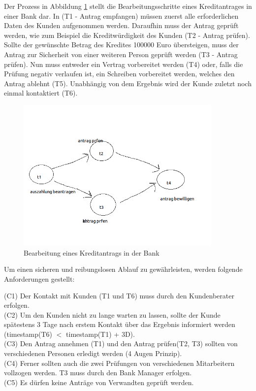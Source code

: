 Der Prozess in Abbildung \ref{fig:Workflow} stellt die Bearbeitungsschritte eines Kreditantrages in einer Bank dar. In (T1 - Antrag empfangen) müssen zuerst alle erforderlichen Daten des Kunden aufgenommen werden. Daraufhin muss der Antrag geprüft werden, wie zum Beispiel die Kreditwürdigkeit des Kunden (T2 - Antrag prüfen). Sollte der gewünschte Betrag des Kredites 100000 Euro übersteigen, muss der Antrag zur Sicherheit von einer weiteren Person geprüft werden (T3 - Antrag prüfen). Nun muss entweder ein Vertrag vorbereitet werden (T4) oder, falls die Prüfung negativ verlaufen ist, ein Schreiben vorbereitet werden, welches den Antrag ablehnt (T5). Unabhängig von dem Ergebnis wird der Kunde zuletzt noch einmal kontaktiert (T6).
\begin{figure}[ht]
	\centering
  \includegraphics[width=0.9\textwidth]{Figures/Workflow}
	\caption{Bearbeitung eines Kreditantrags in der Bank}
	\label{fig:Workflow}
\end{figure}
\newpage
Um einen sicheren und reibungslosen Ablauf zu gewährleisten, werden folgende Anforderungen gestellt:

(C1) Der Kontakt mit Kunden (T1 und T6) muss durch den Kundenberater erfolgen.\\
(C2) Um den Kunden nicht zu lange warten zu lassen, sollte der Kunde spätestens 3 Tage nach erstem Kontakt über das Ergebnis informiert werden (timestamp(T6) $<$ timestamp(T1) + 3D).\\
(C3) Den Antrag annehmen (T1) und den Antrag prüfen(T2, T3) sollten von verschiedenen Personen erledigt werden (4 Augen Prinzip).\\
(C4) Ferner sollten auch die zwei Prüfungen von verschiedenen Mitarbeitern vollzogen werden. T3 muss durch den Bank Manager erfolgen.\\
(C5) Es dürfen keine Anträge von Verwandten geprüft werden.\\


